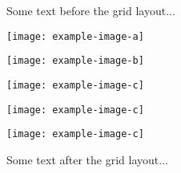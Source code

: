 \documentclass{article}
\begin{document}
Some text before the grid layout...

\begin{gridlayout}[\textwidth]
    \begin{row}{6.5cm}
        \begin{cell}{0.45}
            \texttt{[image: example-image-a]}
        \end{cell}
        \begin{cell}{0.1}
            \hspace{0.1\textwidth}
        \end{cell}
        \begin{cell}{0.45}
            \texttt{[image: example-image-b]}
        \end{cell}
    \end{row}
    \begin{row}{3cm}
        \begin{cell}{0.26}
            \texttt{[image: example-image-c]}
        \end{cell}
        \begin{cell}{0.1}
            \hspace{0.1\textwidth}
        \end{cell}
        \begin{cell}{0.28}
            \centering
            \texttt{[image: example-image-c]}
        \end{cell}
        \begin{cell}{0.1}
            \hspace{0.1\textwidth}
        \end{cell}
        \begin{cell}{0.26}
            \texttt{[image: example-image-c]}
        \end{cell}
    \end{row}
\end{gridlayout}

Some text after the grid layout...
\end{document}
